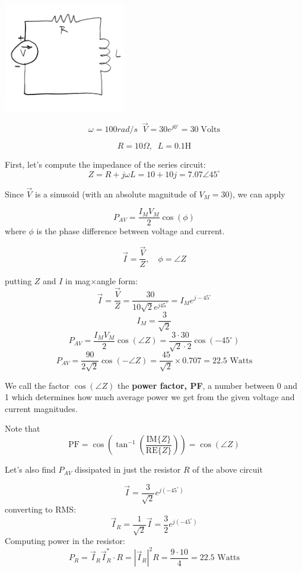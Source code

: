 \includegraphics[width=0.4\textwidth]{figsChapt03/TU95372.png}


\[
\omega = 100 rad/s\;\; \vec{V} = 30 e^{j 0^\circ} = 30\; \mathrm{Volts}
\]

\[
R = 10 \Omega,\;\; L = 0.1 \text{H}
\]
\vspace{0.25in}


First, let's compute the impedance of the series circuit:
\[\boxed{
  Z = R+j\omega L = 10 + 10j = 7.07\angle 45^\circ
  }
\]


\noindent Since $\vec V$ is a sinusoid (with an absolute magnitude of
$V_M=30$), we can apply

\[
P_{AV} = \frac{I_M V_M}{2} \cos(\phi)
\]
where $\phi$ is the phase difference between voltage  and current.

\[
\vec{I} = \frac{\vec{V}}{Z},  \quad \phi = \angle{Z}
\]

putting $Z$ and $I$ in mag$\times$angle form:
\[
\vec{I} = \frac{\vec V}{Z} = \frac{30}{10\sqrt{2} e^{j45^\circ}} = I_M e^{j-45^\circ}
\]
\[\boxed{
    I_M=\frac{3}{\sqrt{2}}
  }
\]
\[
P_{AV} = \frac{I_M V_M}{2} \cos(\angle Z)
= \frac {3 \cdot 30}  {\sqrt{2}\cdot 2} \cos(-45^\circ)
\]
\[\boxed{
    P_{AV} = \frac {90}  {2\sqrt{2}}\cos(-\angle Z)  =  \frac {45}  {\sqrt{2}}\times 0.707 = 22.5\text{ Watts}
    }
\]


We call the factor $\cos(\angle Z)$ the {\bf power factor, PF}, a number
between 0 and 1 which determines how much average power we get from the
given voltage and current magnitudes.

Note that
\[
\mathrm{PF} = \cos\left(\tan^{-1}\left ( \frac {\mathrm{IM}\{Z\} }  {\mathrm{RE}\{Z\}}  \right ) \right) = \cos\left ( \angle{Z}\right )
\]


\vspace{0.3in}
Let's also
find $P_{AV}$ dissipated in just the resistor $R$ of the above circuit


\[
\vec I = \frac {3}  {\sqrt{2}} e^{j(-45^\circ)}
\]
converting to RMS:
\[
\vec {I}_R = \frac {1}  {\sqrt{2}} \vec I =  \frac {3}  {2} e^{j(-45^\circ)}
\]
Computing power in the resistor:
\[
P_R = \vec I_R \vec I_R^*\cdot R = |\vec I_R|^2R = \frac {9\cdot 10}  {4} = 22.5\text{ Watts}
\]


